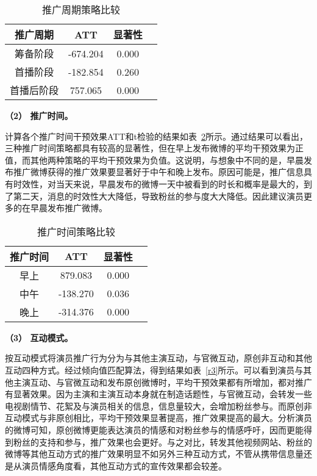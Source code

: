 \begin{table}[h]
\centering
\caption{推广周期策略比较}
\label{r1}
\begin{tabular}{|c|c|c|c|} \hline
推广周期 & ATT & 显著性\\ \hline
筹备阶段 & -674.204& 0.000\\ \hline
首播阶段 & -182.854& 0.260\\ \hline
首播后阶段 & 757.065 & 0.000\\ 
\hline\end{tabular}

\end{table}

\textbf{（2） 推广时间。}

计算各个推广时间干预效果ATT和t检验的结果如表~\ref{r2}所示。通过结果可以看出，三种推广时间策略都具有较高的显著性，但在早上发布微博的平均干预效果为正值，而其他两种策略的平均干预效果为负值。这说明，与想象中不同的是，早晨发布推广微博获得的推广效果要显著好于中午和晚上发布。原因可能是，推广信息具有时效性，对当天来说，早晨发布的微博一天中被看到的时长和概率是最大的，到了第二天，消息的时效性大大降低，导致粉丝的参与度大大降低。因此建议演员更多的在早晨发布推广微博。

\begin{table}[h]
\centering
\caption{推广时间策略比较}
\label{r2}
\begin{tabular}{|c|c|c|c|} \hline
推广时间& ATT & 显著性\\ \hline
早上 & 879.083& 0.000\\ \hline
中午 & -138.270& 0.036\\ \hline
晚上 & -314.376 & 0.000\\ 
\hline\end{tabular}

\end{table}

\textbf{（3） 互动模式。}

按互动模式将演员推广行为分为与其他主演互动，与官微互动，原创非互动和其他互动四种方式。经过倾向值匹配算法，得到结果如表~\ref{r3}所示。可以看到演员与其他主演互动、与官微互动和发布原创微博时，平均干预效果都有所增加，都对推广有显著效果。因为主演和主演互动本身就在制造话题性，与官微互动，会转发一些电视剧情节、花絮及与演员相关的信息，信息量较大，会增加粉丝参与。而原创非互动模式与非原创相比，平均干预效果显著提高，推广效果提高的最大。分析演员的微博可知，原创微博更能表达演员的情感和对粉丝参与的情感呼吁，因而更能得到粉丝的支持和参与，推广效果也会更好。与之对比，转发其他视频网站、粉丝的微博等其他互动方式的推广效果明显不如另外三种互动方式，不管从携带信息量还是从演员情感角度看，其他互动方式的宣传效果都会较差。

